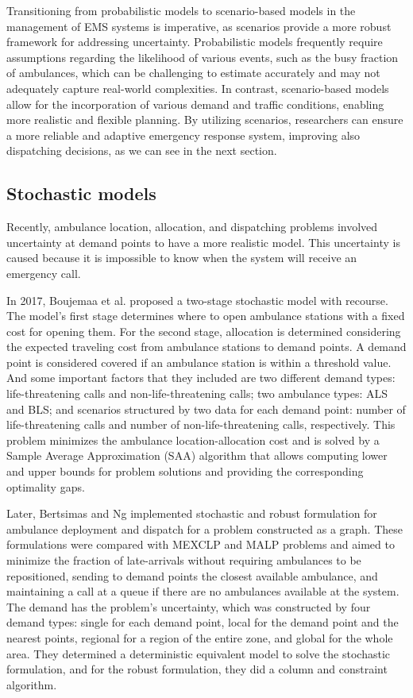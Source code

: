 Transitioning from probabilistic models to scenario-based models in the management of EMS systems is imperative, as scenarios provide a more robust framework for addressing uncertainty. Probabilistic models frequently require assumptions regarding the likelihood of various events, such as the busy fraction of ambulances, which can be challenging to estimate accurately and may not adequately capture real-world complexities. In contrast, scenario-based models allow for the incorporation of various demand and traffic conditions, enabling more realistic and flexible planning. By utilizing scenarios, researchers can ensure a more reliable and adaptive emergency response system, improving also dispatching decisions, as we can see in the next section.

\subsection{Stochastic models}

Recently, ambulance location, allocation, and dispatching problems involved un\-cer\-tain\-ty at demand points to have a more realistic model. This uncertainty is caused because it is impossible to know when the system will receive an emergency call.

In 2017, Boujemaa et al. \citep{boujemaa2018stochastic} proposed a two-stage stochastic model with recourse. The model's first stage determines where to open ambulance stations with a fixed cost for opening them. For the second stage, allocation is determined considering the expected traveling cost from ambulance stations to de\-mand points. A demand point is considered covered if an ambulance station is within a threshold value. And some important factors that they included are two different demand types: life-threatening calls and non-life-threatening calls; two ambulance types: ALS and BLS; and scenarios structured by two data for each demand point: number of life-threatening calls and number of non-life-threatening calls, respectively. This problem minimizes the ambulance location-allocation cost and is solved by a Sample Average Approximation (SAA) algorithm that allows computing lower and upper bounds for problem solutions and providing the corresponding optimality gaps.

Later, Bertsimas and Ng \cite{bertsimas2019robust} implemented stochastic and robust formulation for ambulance deployment and dispatch for a problem constructed as a graph. These formulations were compared with MEXCLP and MALP problems and aimed to minimize the fraction of late-arrivals without requiring ambulances to be repositioned, sending to demand points the closest available ambulance, and maintaining a call at a queue if there are no ambulances available at the system. The demand has the problem's uncertainty, which was constructed by four demand types: single for each demand point, local for the demand point and the nearest points, regional for a region of the entire zone, and global for the whole area. They determined a deterministic equivalent model to solve the stochastic formulation, and for the robust formulation, they did a column and constraint algorithm.  

